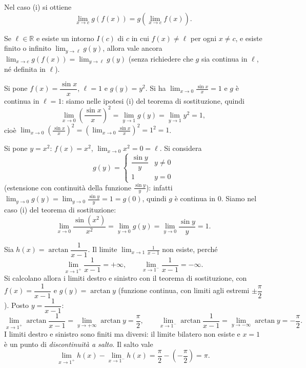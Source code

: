 \documentclass[11pt,a4paper]{article}
\begin{document}
Nel caso (i) si ottiene
\[
  \lim_{x\to c} g(f(x)) = g\!\left(\lim_{x\to c} f(x)\right).
\]

\begin{osservazione}[Variante (i$'$)]
Se $\ell \in \mathbb{R}$ e esiste un intorno $I(c)$ di $c$ in cui $f(x) \neq \ell$ per ogni $x \neq c$, e esiste finito o infinito $\displaystyle\lim_{y\to\ell} g(y)$, allora vale ancora $\displaystyle\lim_{x\to c} g(f(x)) = \lim_{y\to\ell} g(y)$ (senza richiedere che $g$ sia continua in $\ell$, né definita in $\ell$).
\end{osservazione}

\begin{esempio}
Si pone $f(x) = \dfrac{\sin x}{x}$, $\ell = 1$ e $g(y) = y^2$. Si ha $\displaystyle\lim_{x\to 0}\frac{\sin x}{x} = 1$ e $g$ è continua in $\ell = 1$: siamo nelle ipotesi (i) del teorema di sostituzione, quindi
\[
  \lim_{x\to 0}\left(\frac{\sin x}{x}\right)^{2} = \lim_{y\to 1} g(y) = \lim_{y\to 1} y^2 = 1,
\]
cioè $\displaystyle\lim_{x\to 0}\left(\frac{\sin x}{x}\right)^{2} = \left(\lim_{x\to 0}\frac{\sin x}{x}\right)^{2} = 1^2 = 1$.
\end{esempio}

\begin{esempio}
Si pone $y = x^2$: $f(x) = x^2$, $\displaystyle\lim_{x\to 0} x^2 = 0 = \ell$. Si considera
\[
  g(y) = \begin{cases} \dfrac{\sin y}{y} & y \neq 0 \\[2mm] 1 & y = 0 \end{cases}
\]
(estensione con continuità della funzione $\frac{\sin y}{y}$): infatti $\displaystyle\lim_{y\to 0} g(y) = \lim_{y\to 0}\frac{\sin y}{y} = 1 = g(0)$, quindi $g$ è continua in $0$. Siamo nel caso (i) del teorema di sostituzione:
\[
  \lim_{x\to 0}\frac{\sin(x^2)}{x^2} = \lim_{y\to 0} g(y) = \lim_{y\to 0}\frac{\sin y}{y} = 1.
\]
\end{esempio}

\begin{esempio}
Sia $h(x) = \arctan\dfrac{1}{x - 1}$. Il limite $\displaystyle\lim_{x\to 1}\frac{1}{x-1}$ non esiste, perché
\[
  \lim_{x\to 1^+}\frac{1}{x-1} = +\infty, \qquad \lim_{x\to 1^-}\frac{1}{x-1} = -\infty .
\]
Si calcolano allora i limiti destro e sinistro con il teorema di sostituzione, con $f(x) = \dfrac{1}{x-1}$ e $g(y) = \arctan y$ (funzione continua, con limiti agli estremi $\pm\dfrac{\pi}{2}$). Posto $y = \dfrac{1}{x-1}$:
\[
  \lim_{x\to 1^+}\arctan\frac{1}{x - 1} = \lim_{y\to+\infty}\arctan y = \frac{\pi}{2}, \qquad
  \lim_{x\to 1^-}\arctan\frac{1}{x - 1} = \lim_{y\to-\infty}\arctan y = -\frac{\pi}{2}.
\]
I limiti destro e sinistro sono finiti ma diversi: il limite bilatero non esiste e $x = 1$ è un punto di \emph{discontinuità a salto}. Il salto vale
\[
  \lim_{x\to 1^+}h(x) - \lim_{x\to 1^-}h(x) = \frac{\pi}{2} - \left(-\frac{\pi}{2}\right) = \pi .
\]
\end{esempio}
\end{document}
